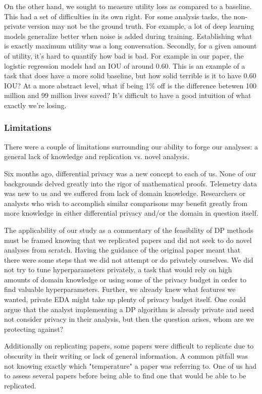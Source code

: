 \documentclass[12pt,letterpaper]{article}
\begin{document}
{On the other hand, we sought to measure utility loss as compared to a baseline. This had a set of difficulties in its own right. For some analysis tasks, the non-private version may not be the ground truth. For example, a lot of deep learning models generalize better when noise is added during training. Establishing what is exactly maximum utility was a long conversation. Secondly, for a given amount of utility, it's hard to quantify how bad is bad. For example in our paper, the logistic regression models had an IOU of around 0.60. This is an example of a task that does have a more solid baseline, but how solid terrible is it to have 0.60 IOU? At a more abstract level, what if being 1\% off is the difference betewen 100 million and 99 million lives saved? It's difficult to have a good intuition of what exactly we're losing.

\subsubsection{Limitations}
There were a couple of limitations surrounding our ability to forge our analyses: a general lack of knowledge and replication vs. novel analysis.

Six months ago, differential privacy was a new concept to each of us. None of our backgrounds delved greatly into the rigor of mathematical proofs. Telemetry data was new to us and we suffered from lack of domain knowledge. Researchers or analysts who wish to accomplish similar comparisons may benefit greatly from more knowledge in either differential privacy and/or the domain in question itself. 

The applicability of our study as a commentary of the feasibility of DP methods must be framed knowing that we replicated papers and did not seek to do novel analyses from scratch. Having the guidance of the original paper meant that there were some steps that we did not attempt or do privately ourselves. We did not try to tune hyperparameters privately, a task that would rely on high amounts of domain knowledge or using some of the privacy budget in order to find valuable hyperparameters. Further, we already knew what features we wanted, private EDA might take up plenty of privacy budget itself. One could argue that the analyst implementing a DP algorithm is already private and need not consider privacy in their analysis, but then the question arises, whom are we protecting against?

Additionally on replicating papers, some papers were difficult to replicate due to obscurity in their writing or lack of general information. A common pitfall was not knowing exactly which "temperature" a paper was referring to. One of us had to assess several papers before being able to find one that would be able to be replicated.


}
\end{document}
